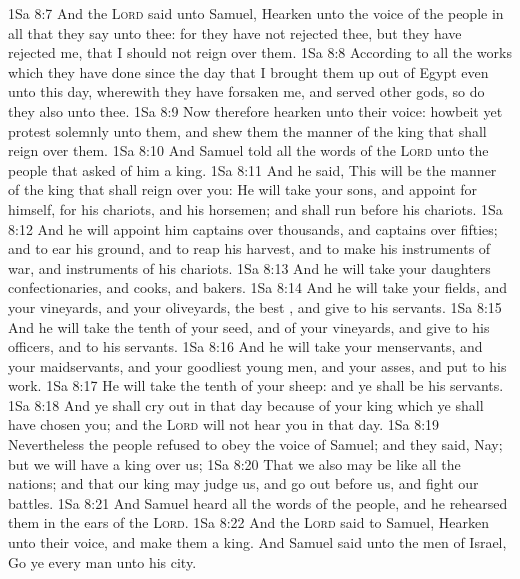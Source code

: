 \vs 1Sa 8:7 And the \textsc{Lord} said unto Samuel, Hearken unto the voice of the people in all that they say unto thee: for they have not rejected thee, but they have rejected me, that I should not reign over them.
\vs 1Sa 8:8 According to all the works which they have done since the day that I brought them up out of Egypt even unto this day, wherewith they have forsaken me, and served other gods, so do they also unto thee.
\vs 1Sa 8:9 Now therefore hearken unto their voice: howbeit yet protest solemnly unto them, and shew them the manner of the king that shall reign over them.
\vs 1Sa 8:10 And Samuel told all the words of the \textsc{Lord} unto the people that asked of him a king.
\vs 1Sa 8:11 And he said, This will be the manner of the king that shall reign over you: He will take your sons, and appoint  for himself, for his chariots, and  his horsemen; and  shall run before his chariots.
\vs 1Sa 8:12 And he will appoint him captains over thousands, and captains over fifties; and  to ear his ground, and to reap his harvest, and to make his instruments of war, and instruments of his chariots.
\vs 1Sa 8:13 And he will take your daughters  confectionaries, and  cooks, and  bakers.
\vs 1Sa 8:14 And he will take your fields, and your vineyards, and your oliveyards,  the best , and give  to his servants.
\vs 1Sa 8:15 And he will take the tenth of your seed, and of your vineyards, and give to his officers, and to his servants.
\vs 1Sa 8:16 And he will take your menservants, and your maidservants, and your goodliest young men, and your asses, and put  to his work.
\vs 1Sa 8:17 He will take the tenth of your sheep: and ye shall be his servants.
\vs 1Sa 8:18 And ye shall cry out in that day because of your king which ye shall have chosen you; and the \textsc{Lord} will not hear you in that day.
\vs 1Sa 8:19 Nevertheless the people refused to obey the voice of Samuel; and they said, Nay; but we will have a king over us;
\vs 1Sa 8:20 That we also may be like all the nations; and that our king may judge us, and go out before us, and fight our battles.
\vs 1Sa 8:21 And Samuel heard all the words of the people, and he rehearsed them in the ears of the \textsc{Lord}.
\vs 1Sa 8:22 And the \textsc{Lord} said to Samuel, Hearken unto their voice, and make them a king. And Samuel said unto the men of Israel, Go ye every man unto his city.
